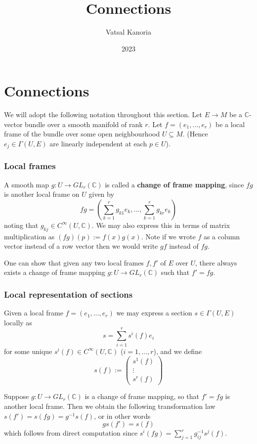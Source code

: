 \documentclass[a4paper]{article}
\theoremstyle{definition} \newtheorem*{definition}{Definition}
\theoremstyle{definition} \newtheorem*{definitions}{Definitions}
\theoremstyle{plain} \newtheorem{theorem}{Theorem}[section]
\theoremstyle{plain} \newtheorem{proposition}[theorem]{Proposition}
\theoremstyle{plain} \newtheorem{corollary}[theorem]{Corollary}
\theoremstyle{plain} \newtheorem{lemma}[theorem]{Lemma}
\theoremstyle{plain} \newtheorem{example}[theorem]{Example}
\newcommand{\defn}[1]{\textbf{#1}}
\newcommand{\complexnos}{\mathbb{C}}
\newcommand{\smoothCmaps}{C^\infty (U, \complexnos)}
\begin{document}
\title{Connections}
\author{Vatsal Kanoria}
\date{2023}
\maketitle

\tableofcontents

\section{Connections}
We will adopt the following notation throughout this section. Let $E\to M$ be a $\complexnos$-vector bundle over a smooth manifold of rank $r$.
Let $f=(e_1,\ldots, e_r)$ be a local frame of the bundle over some open neighbourhood $U\subseteq M$. (Hence $e_j\in \Gamma(U, E)$ are linearly independent at each $p\in U$).

\subsubsection{Local frames}
A smooth map $g:U\to GL_r(\complexnos)$ is called a \defn{change of frame mapping}, since $fg$ is another local frame on $U$ given by 
$$fg=(\sum_{k=1}^r g_{k1}e_k,\ldots, \sum_{k=1}^r g_{kr}e_k)$$
noting that $g_{kj}\in \smoothCmaps$. We may also express this in terms of matrix multiplication as $(fg)(p):=f(x)g(x)$. Note if we wrote $f$ as a column vector instead of a row vector then we would write $gf$ instead of $fg$.

One can show that given any two local frames $f, f'$ of $E$ over $U$, there always exists a change of frame mapping $g:U\to GL_r(\complexnos)$ such that $f'=fg$. 

\subsubsection{Local representation of sections}
Given a local frame $f=(e_1,\ldots, e_r)$ we may express a section $s\in \Gamma(U, E)$ locally as
$$s=\sum_{i=1}^r s^i(f)e_i$$
for some unique $s^i(f)\in \smoothCmaps$ ($i=1,\ldots, r$), and we define 
$$s(f):= \begin{pmatrix}s^1(f) \\ \vdots \\ s^r(f)\end{pmatrix}$$

Suppose $g:U\to GL_r(\complexnos)$ is a change of frame mapping, so that $f'=fg$ is another local frame. Then we obtain the following transformation law $s(f')=s(fg)=g^{-1}s(f)$, or in other words
$$gs(f')=s(f)$$
which follows from direct computation since $s^i(fg)=\sum_{j=1}^r g_{ij}^{-1} s^j(f)$.
\end{document}
